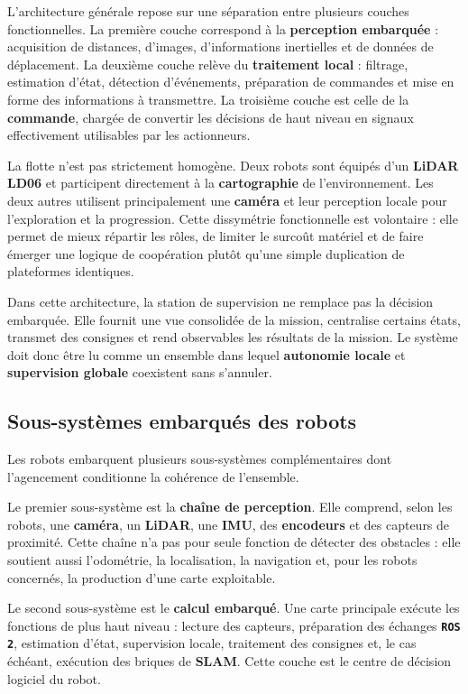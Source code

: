 \documentclass[11pt,a4paper]{report}
\newcommand{\kw}[1]{\textbf{#1}}
\newcommand{\outil}[1]{\textbf{\texttt{#1}}}
\begin{document}
L’architecture générale repose sur une séparation entre plusieurs couches fonctionnelles. La première couche correspond à la \kw{perception embarquée} : acquisition de distances, d’images, d’informations inertielles et de données de déplacement. La deuxième couche relève du \kw{traitement local} : filtrage, estimation d’état, détection d’événements, préparation de commandes et mise en forme des informations à transmettre. La troisième couche est celle de la \kw{commande}, chargée de convertir les décisions de haut niveau en signaux effectivement utilisables par les actionneurs.

La flotte n’est pas strictement homogène. Deux robots sont équipés d’un \kw{LiDAR LD06} et participent directement à la \kw{cartographie} de l’environnement. Les deux autres utilisent principalement une \kw{caméra} et leur perception locale pour l’exploration et la progression. Cette dissymétrie fonctionnelle est volontaire : elle permet de mieux répartir les rôles, de limiter le surcoût matériel et de faire émerger une logique de coopération plutôt qu’une simple duplication de plateformes identiques.

Dans cette architecture, la station de supervision ne remplace pas la décision embarquée. Elle fournit une vue consolidée de la mission, centralise certains états, transmet des consignes et rend observables les résultats de la mission. Le système doit donc être lu comme un ensemble dans lequel \kw{autonomie locale} et \kw{supervision globale} coexistent sans s’annuler.

\subsection{Sous-systèmes embarqués des robots}

Les robots embarquent plusieurs sous-systèmes complémentaires dont l’agencement conditionne la cohérence de l’ensemble.

Le premier sous-système est la \kw{chaîne de perception}. Elle comprend, selon les robots, une \kw{caméra}, un \kw{LiDAR}, une \kw{IMU}, des \kw{encodeurs} et des capteurs de proximité. Cette chaîne n’a pas pour seule fonction de détecter des obstacles : elle soutient aussi l’odométrie, la localisation, la navigation et, pour les robots concernés, la production d’une carte exploitable.

Le second sous-système est le \kw{calcul embarqué}. Une carte principale exécute les fonctions de plus haut niveau : lecture des capteurs, préparation des échanges \outil{ROS 2}, estimation d’état, supervision locale, traitement des consignes et, le cas échéant, exécution des briques de \kw{SLAM}. Cette couche est le centre de décision logiciel du robot.
\end{document}

